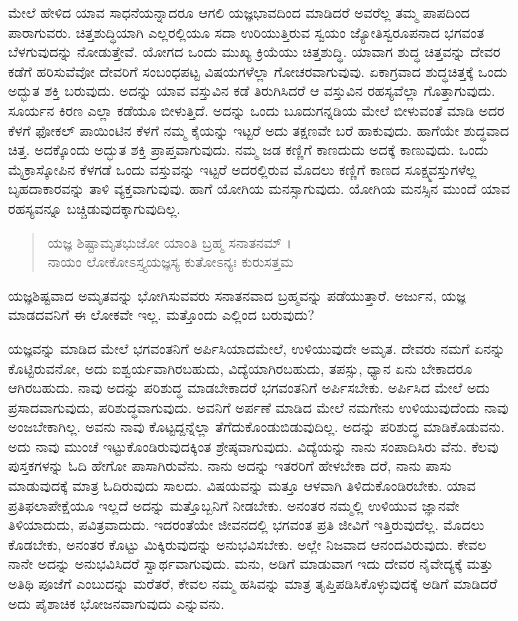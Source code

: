 ಮೇಲೆ ಹೇಳಿದ ಯಾವ ಸಾಧನೆಯನ್ನಾದರೂ ಆಗಲಿ ಯಜ್ಞಭಾವದಿಂದ ಮಾಡಿದರೆ ಅವರೆಲ್ಲ ತಮ್ಮ ಪಾಪದಿಂದ ಪಾರಾಗುವರು. ಚಿತ್ತಶುದ್ಧಿಯಾಗಿ ಎಲ್ಲರಲ್ಲಿಯೂ ಸದಾ ಉರಿಯುತ್ತಿರುವ ಸ್ವಯಂ ಜ್ಯೋತಿಸ್ವರೂಪನಾದ ಭಗವಂತ ಬೆಳಗುವುದನ್ನು ನೋಡುತ್ತೇವೆ. ಯೋಗದ ಒಂದು ಮುಖ್ಯ ಕ್ರಿಯೆಯು ಚಿತ್ತಶುದ್ಧಿ. ಯಾವಾಗ ಶುದ್ಧ ಚಿತ್ತವನ್ನು ದೇವರ ಕಡೆಗೆ ಹರಿಸುವೆವೋ ದೇವರಿಗೆ ಸಂಬಂಧಪಟ್ಟ ವಿಷಯಗಳೆಲ್ಲಾ ಗೋಚರವಾಗುವುವು. ಏಕಾಗ್ರವಾದ ಶುದ್ಧಚಿತ್ತಕ್ಕೆ ಒಂದು ಅದ್ಭುತ ಶಕ್ತಿ ಬರುವುದು. ಅದನ್ನು ಯಾವ ವಸ್ತುವಿನ ಕಡೆ ತಿರುಗಿಸಿದರೆ ಆ ವಸ್ತುವಿನ ರಹಸ್ಯವೆಲ್ಲಾ ಗೊತ್ತಾಗುವುದು. ಸೂರ್ಯನ ಕಿರಣ ಎಲ್ಲಾ ಕಡೆಯೂ ಬೀಳುತ್ತಿದೆ. ಅದನ್ನು ಒಂದು ಬೂದುಗನ್ನಡಿಯ ಮೇಲೆ ಬೀಳುವಂತೆ ಮಾಡಿ ಅದರ ಕೆಳಗೆ ಫೋಕಲ್ ಪಾಯಿಂಟಿನ ಕೆಳಗೆ ನಮ್ಮ ಕೈಯನ್ನು ಇಟ್ಟರೆ ಅದು ತಕ್ಷಣವೇ ಬರೆ ಹಾಕುವುದು. ಹಾಗೆಯೇ ಶುದ್ಧವಾದ ಚಿತ್ತ. ಅದಕ್ಕೊಂದು ಅದ್ಭುತ ಶಕ್ತಿ ಪ್ರಾಪ್ತವಾಗುವುದು. ನಮ್ಮ ಜಡ ಕಣ್ಣಿಗೆ ಕಾಣದುದು ಅದಕ್ಕೆ ಕಾಣುವುದು. ಒಂದು ಮೈಕ್ರಾಸ್ಕೋಪಿನ ಕೆಳಗಡೆ ಒಂದು ವಸ್ತುವನ್ನು ಇಟ್ಟರೆ ಅದರಲ್ಲಿರುವ ಮೊದಲು ಕಣ್ಣಿಗೆ ಕಾಣದ ಸೂಕ್ಷ್ಮವಸ್ತುಗಳೆಲ್ಲ ಬೃಹದಾಕಾರವನ್ನು ತಾಳಿ ವ್ಯಕ್ತವಾಗುವುವು. ಹಾಗೆ ಯೋಗಿಯ ಮನಸ್ಸಾಗುವುದು. ಯೋಗಿಯ ಮನಸ್ಸಿನ ಮುಂದೆ ಯಾವ ರಹಸ್ಯವನ್ನೂ ಬಚ್ಚಿಡುವುದಕ್ಕಾಗುವುದಿಲ್ಲ.

\begin{verse}
ಯಜ್ಞ ಶಿಷ್ಟಾಮೃತಭುಜೋ ಯಾಂತಿ ಬ್ರಹ್ಮ ಸನಾತನಮ್ ।\\ನಾಯಂ ಲೋಕೋಽಸ್ತ್ಯಯಜ್ಞಸ್ಯ ಕುತೋಽನ್ಯಃ ಕುರುಸತ್ತಮ 
\end{verse}

{\small ಯಜ್ಞಶಿಷ್ಟವಾದ ಅಮೃತವನ್ನು ಭೋಗಿಸುವವರು ಸನಾತನವಾದ ಬ್ರಹ್ಮವನ್ನು ಪಡೆಯುತ್ತಾರೆ. ಅರ್ಜುನ, ಯಜ್ಞ ಮಾಡದವನಿಗೆ ಈ ಲೋಕವೇ ಇಲ್ಲ. ಮತ್ತೊಂದು ಎಲ್ಲಿಂದ ಬರುವುದು?}

ಯಜ್ಞವನ್ನು ಮಾಡಿದ ಮೇಲೆ ಭಗವಂತನಿಗೆ ಅರ್ಪಿಸಿಯಾದಮೇಲೆ, ಉಳಿಯುವುದೇ ಅಮೃತ. ದೇವರು ನಮಗೆ ಏನನ್ನು ಕೊಟ್ಟಿರುವನೋ, ಅದು ಐಶ್ವರ್ಯವಾಗಿರಬಹುದು, ವಿದ್ಯೆಯಾಗಿರಬಹುದು, ತಪಸ್ಸು, ಧ್ಯಾನ ಏನು ಬೇಕಾದರೂ ಆಗಿರಬಹುದು. ನಾವು ಅದನ್ನು ಪರಿಶುದ್ಧ ಮಾಡಬೇಕಾದರೆ ಭಗವಂತನಿಗೆ ಅರ್ಪಿಸಬೇಕು. ಅರ್ಪಿಸಿದ ಮೇಲೆ ಅದು ಪ್ರಸಾದವಾಗುವುದು, ಪರಿಶುದ್ಧವಾಗುವುದು. ಅವನಿಗೆ ಅರ್ಪಣೆ ಮಾಡಿದ ಮೇಲೆ ನಮಗೇನು ಉಳಿಯುವುದೆಂದು ನಾವು ಅಂಜಬೇಕಾಗಿಲ್ಲ. ಅವನು ನಾವು ಕೊಟ್ಟದ್ದನ್ನೆಲ್ಲಾ ತೆಗೆದುಕೊಂಡುಬಿಡುವುದಿಲ್ಲ. ಅದನ್ನು ಪರಿಶುದ್ಧ ಮಾಡಿಕೊಡುವನು. ಅದು ನಾವು ಮುಂಚೆ ಇಟ್ಟುಕೊಂಡಿರುವುದಕ್ಕಿಂತ ಶ್ರೇಷ್ಠವಾಗುವುದು. ವಿದ್ಯೆಯನ್ನು ನಾನು ಸಂಪಾದಿಸಿರು ವೆನು. ಕೆಲವು ಪುಸ್ತಕಗಳನ್ನು ಓದಿ ಹೇಗೋ ಪಾಸಾಗಿರುವೆನು. ನಾನು ಅದನ್ನು ಇತರರಿಗೆ ಹೇಳಬೇಕಾ ದರೆ, ನಾನು ಪಾಸು ಮಾಡುವುದಕ್ಕೆ ಮಾತ್ರ ಓದಿರುವುದು ಸಾಲದು. ವಿಷಯವನ್ನು ಮತ್ತೂ ಆಳವಾಗಿ ತಿಳಿದುಕೊಂಡಿರಬೇಕು. ಯಾವ ಪ್ರತಿಫಲಾಪೇಕ್ಷೆಯೂ ಇಲ್ಲದೆ ಅದನ್ನು ಮತ್ತೊಬ್ಬನಿಗೆ ನೀಡಬೇಕು. ಅನಂತರ ನಮ್ಮಲ್ಲಿ ಉಳಿಯುವ ಜ್ಞಾನವೇ ತಿಳಿಯಾದುದು, ಪವಿತ್ರವಾದುದು. ಇದರಂತೆಯೇ ಜೀವನದಲ್ಲಿ ಭಗವಂತ ಪ್ರತಿ ಜೀವಿಗೆ ಇತ್ತಿರುವುದೆಲ್ಲ. ಮೊದಲು ಕೊಡಬೇಕು, ಅನಂತರ ಕೊಟ್ಟು ಮಿಕ್ಕಿರುವುದನ್ನು ಅನುಭವಿಸಬೇಕು. ಅಲ್ಲೇ ನಿಜವಾದ ಆನಂದವಿರುವುದು. ಕೇವಲ ನಾನೇ ಅದನ್ನು ಅನುಭವಿಸಿದರೆ ಸ್ವಾರ್ಥವಾಗುವುದು. ಮನು, ಅಡಿಗೆ ಮಾಡುವಾಗ ಇದು ದೇವರ ನೈವೇದ್ಯಕ್ಕೆ ಮತ್ತು ಅತಿಥಿ ಪೂಜೆಗೆ ಎಂಬುದನ್ನು ಮರೆತರೆ, ಕೇವಲ ನಮ್ಮ ಹಸಿವನ್ನು ಮಾತ್ರ ತೃಪ್ತಿಪಡಿಸಿಕೊಳ್ಳುವುದಕ್ಕೆ ಅಡಿಗೆ ಮಾಡಿದರೆ ಅದು ಪೈಶಾಚಿಕ ಭೋಜನವಾಗುವುದು ಎನ್ನುವನು.

